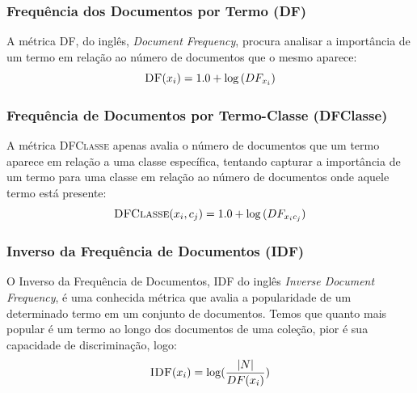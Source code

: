\subsubsection{Frequência dos Documentos por Termo (DF)}
\label{subsubsection::df}

A métrica \textsc{DF}, do inglês, \textit{Document Frequency}, procura analisar a importância de um termo em relação ao número de documentos que o mesmo aparece:
\begin{equation}\label{eqn::df}
  \textsc{DF}(x_i) = 1.0 + \log{ ( DF_{x_i} ) }
\end{equation}



\subsubsection{Frequência de Documentos por Termo-Classe (DFClasse)}
\label{subsubsection::sumdf}

A métrica \textsc{DFClasse} apenas avalia o número de documentos que um termo aparece em relação a uma classe específica, tentando capturar a importância de um termo para uma classe em relação ao número de documentos onde aquele termo está presente:
\begin{equation}\label{eqn::sumtf}
 \textsc{DFClasse}(x_i,c_j) = 1.0 + \log{ ( DF_{x_ic_j} ) }
\end{equation}


\subsubsection{Inverso da Frequência de Documentos (\textsc{IDF})}
\label{subsubsection::idf}

O Inverso da Frequência de Documentos, \textsc{IDF} do inglês \textit{Inverse Document Frequency}, é uma conhecida métrica que avalia a popularidade de um determinado termo em um conjunto de documentos. Temos que quanto mais popular é um termo ao longo dos documentos de uma coleção, pior é sua capacidade de discriminação, logo:
\begin{equation}\label{eqn::tficf}
 \textsc{IDF}(x_i) = \log( \frac{|N|} {DF(x_i)} )
\end{equation}


